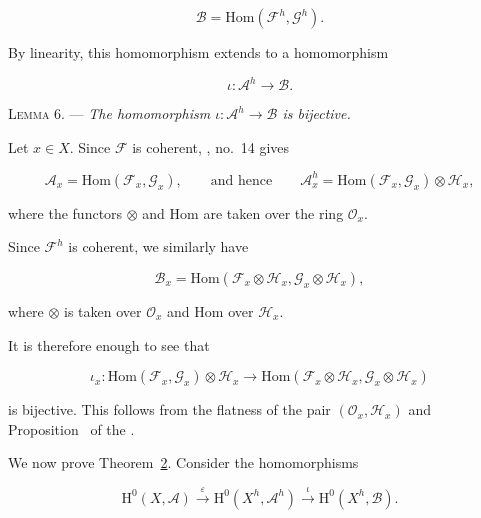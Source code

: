 \begin{equation*}
\mathcal{B}=\mathrm{Hom}(\mathcal{F}^h,\mathcal{G}^h).
\end{equation*}

By linearity, this homomorphism extends to a homomorphism

\begin{equation*}
\iota:\mathcal{A}^h\longrightarrow\mathcal{B}.
\end{equation*}

\textsc{Lemma 6}. --- \emph{The homomorphism $\iota:\mathcal{A}^h\to\mathcal{B}$ is bijective.}

Let $x\in X$. Since $\mathcal{F}$ is coherent, , no.~14 gives

\begin{equation*}
\mathcal{A}_x=\mathrm{Hom}(\mathcal{F}_x,\mathcal{G}_x),
\qquad\text{and hence}\qquad
\mathcal{A}^h_x=
\mathrm{Hom}(\mathcal{F}_x,\mathcal{G}_x)\otimes\mathcal{H}_x,
\end{equation*}

where the functors $\otimes$ and $\mathrm{Hom}$ are taken over the ring $\mathcal{O}_x$.

Since $\mathcal{F}^h$ is coherent, we similarly have

\begin{equation*}
\mathcal{B}_x=
\mathrm{Hom}(\mathcal{F}_x\otimes\mathcal{H}_x,
\mathcal{G}_x\otimes\mathcal{H}_x),
\end{equation*}

where $\otimes$ is taken over $\mathcal{O}_x$ and $\mathrm{Hom}$ over $\mathcal{H}_x$.

It is therefore enough to see that

\begin{equation*}
\iota_x:
\mathrm{Hom}(\mathcal{F}_x,\mathcal{G}_x)\otimes\mathcal{H}_x
\longrightarrow
\mathrm{Hom}(\mathcal{F}_x\otimes\mathcal{H}_x,
\mathcal{G}_x\otimes\mathcal{H}_x)
\end{equation*}

is bijective. This follows from the flatness of the pair $(\mathcal{O}_x,\mathcal{H}_x)$ and Proposition~ of the .

We now prove Theorem~\hyperref[gaga:thm:2]{2}. Consider the homomorphisms

\begin{equation*}
\mathrm{H}^0(X,\mathcal{A})
\xrightarrow{\varepsilon}
\mathrm{H}^0(X^h,\mathcal{A}^h)
\xrightarrow{\iota}
\mathrm{H}^0(X^h,\mathcal{B}).
\end{equation*}

